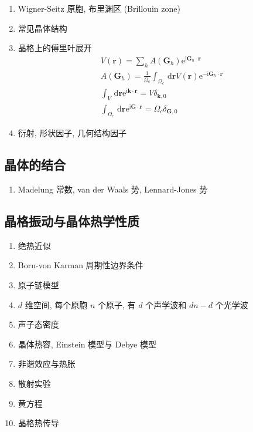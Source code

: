 \documentclass[11pt,a4paper]{article}%
\numberwithin{equation}{section}%
\renewcommand*{\vec}[1]{\bm{#1}}%
\newcommand{\dif}{\,\mathrm d}
\newcommand\mi{\mathrm{i}}
\newcommand\e{\mathrm{e}}%
\begin{document}
\begin{enumerate}
	\item Wigner-Seitz 原胞, 布里渊区 (Brillouin zone)
	\item 常见晶体结构
	\item 晶格上的傅里叶展开
	\begin{align}
		& V(\vec r) = \sum_h A(\vec G_h)\e^{\mi\vec G_h\cdot\vec r} \\
		& A(\vec G_h) = \frac 1{\Omega_c}\int_{\Omega_c}\dif\vec r V(\vec r)\e^{-\mi\vec G_h\cdot\vec r }\\
		& \int_V\dif\vec r\e^{\mi\vec k\cdot\vec r} = V\delta_{\vec k,0} \\
		&\int_{\Omega_c}\dif\vec r\e^{\mi\vec G\cdot\vec r} = {\Omega_c} \delta_{\vec G, 0}
	\end{align}
	\item 衍射, 形状因子, 几何结构因子
\end{enumerate}
\subsection{晶体的结合} %
\label{sub:cry_comp}
\begin{enumerate}
	\item Madelung 常数, van der Waals 势, Lennard-Jones 势
\end{enumerate}
\subsection{晶格振动与晶体热学性质} %
\label{sub:cry_oscillate}
\begin{enumerate}
	\item 绝热近似
	\item Born-von Karman 周期性边界条件
	\item 原子链模型
	\item $d$ 维空间, 每个原胞 $n$ 个原子, 有 $d$ 个声学波和 $dn - d$ 个光学波
	\item 声子态密度
	\item 晶体热容, Einstein 模型与 Debye 模型
	\item 非谐效应与热胀
	\item 散射实验
	\item 黄方程
	\item 晶格热传导
\end{enumerate}
\end{document}

